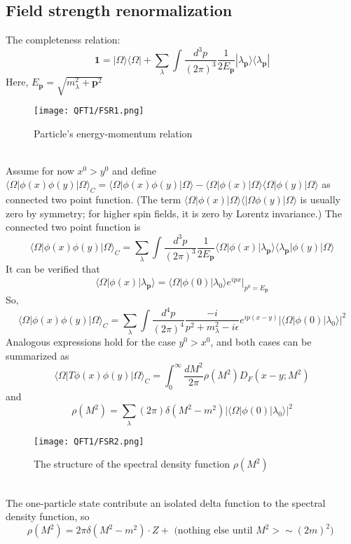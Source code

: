 \documentclass[cyan]{elegantnote}
\begin{document}
\subsection{Field strength renormalization}
\noindent
The completeness relation:
\[\bm{1} = |\Omega\rangle\langle\Omega| +  \sum_{\lambda} \int \frac{d^3p}{(2\pi)^3} \frac{1}{2E_{\bm{p}}} |\lambda_{\bm{p}}\rangle\langle\lambda_{\bm{p}}|\]
Here, $E_{\bm{p}} = \sqrt{m_{\lambda}^2 + \bm{p}^2}$\\
\begin{figure}[!h]
\centering
\texttt{[image: QFT1/FSR1.png]}
\caption{Particle's energy-momentum relation}
\end{figure}
\\
Assume for now $x^0 > y^0$ and define $\langle \Omega | \phi(x) \phi(y) | \Omega \rangle_{C} = \langle \Omega | \phi(x) \phi(y) | \Omega \rangle - \langle \Omega | \phi(x)| \Omega \rangle \langle \Omega | \phi(y) | \Omega \rangle$ as connected two point function. (The term $\langle \Omega | \phi(x)| \Omega \rangle \langle | \Omega \phi(y) | \Omega \rangle$ is usually zero by symmetry; for higher spin fields, it is zero by Lorentz invariance.) The connected two point function is
\[\langle \Omega | \phi(x) \phi(y) | \Omega \rangle_{C} = \sum_{\lambda} \int \frac{d^3p}{(2\pi)^3} \frac{1}{2E_{\bm{p}}} \langle \Omega | \phi(x) |\lambda_{\bm{p}}\rangle\langle\lambda_{\bm{p}}| \phi(y) | \Omega \rangle\]
It can be verified that
\[\langle \Omega | \phi(x) |\lambda_{\bm{p}}\rangle = \langle \Omega | \phi(0) | \lambda_0 \rangle e^{ipx} |_{p^0 = E_{\bm{p}}}\]
So,
\[\langle \Omega | \phi(x) \phi(y) | \Omega \rangle_C = \sum_{\lambda} \int \frac{d^4p}{(2\pi)^4} \frac{-i}{p^2 + m_{\lambda}^2 -i\epsilon} e^{ip(x-y)} |\langle \Omega | \phi(0) | \lambda_0 \rangle|^2\]
Analogous expressions hold for the case $y^0 > x^0$, and both cases can be summarized as
\[\langle \Omega | T \phi(x) \phi(y) | \Omega \rangle_C = \int_0^{\infty} \frac{dM^2}{2\pi} \rho(M^2) D_F(x-y;M^2)\]
and 
\[\rho(M^2) = \sum_{\lambda} (2\pi) \delta(M^2-m^2)|\langle \Omega | \phi(0) | \lambda_0 \rangle|^2 \]
\begin{figure}[!h]
\centering
\texttt{[image: QFT1/FSR2.png]}
\caption{The structure of the spectral density function $\rho(M^2)$}
\end{figure}\\
The one-particle state contribute an isolated delta function to the spectral density function, so
\[\rho(M^2) = 2\pi \delta (M^2 -m^2) \cdot Z + \mbox{ (nothing else until $M^2 > \sim (2m)^2$) }\]
\end{document}
